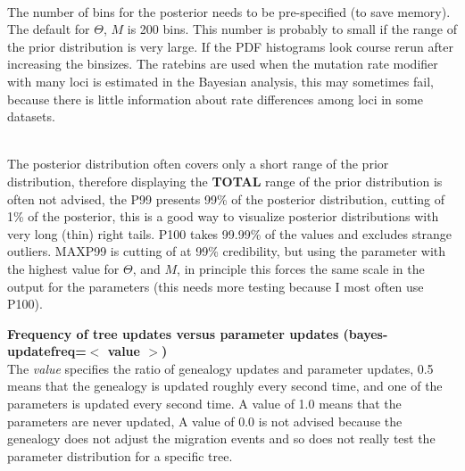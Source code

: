 \begin{description}
\item{}\\
The number of bins for the posterior needs to be pre-specified (to save memory). The default for $\Theta$, $M$ is 200 bins.
This number is probably to small if the range of the prior distribution is very large. If the PDF histograms look course rerun after increasing the binsizes. The ratebins are used when the mutation rate modifier with many loci is estimated in the Bayesian analysis,
this may sometimes fail, because there is little information about rate differences among loci in some datasets.

\item{}\\
The posterior distribution often covers only a short range of the prior distribution, therefore displaying the \textbf{ TOTAL} range of the prior distribution is often not advised, the P99 presents 99\% of the posterior distribution, cutting of 1\% of the posterior, this is a good way to visualize posterior distributions with very long (thin) right tails. P100 takes 99.99\% of the values and excludes strange outliers. MAXP99 is cutting of at 99\% credibility, but using the parameter with the highest value  for $\Theta$, and $M$, in principle this forces the same scale in the output for the parameters (this needs more testing because I most often use P100).

\item\textbf{ Frequency of tree updates versus parameter updates  (bayes-updatefreq=$<$ value $>$)}\\
The \textsl{value} specifies the ratio of genealogy updates and parameter updates, 0.5 means that the genealogy is updated roughly every second time, and one of the parameters is updated every second time. A value of 1.0 means that the parameters are never updated, A value of 0.0 is not advised because the genealogy does not adjust the migration events and so does not really test the parameter distribution for a specific tree.


\end{description}
